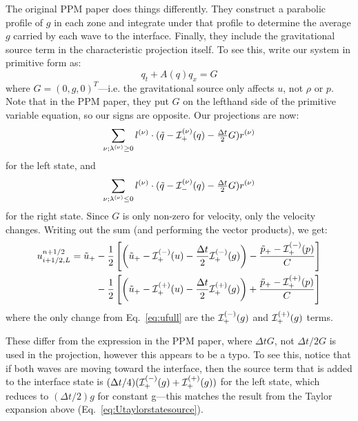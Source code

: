 The original PPM paper does things differently.  They construct a parabolic
profile of $g$ in each zone and integrate under that profile to determine
the average $g$ carried by each wave to the interface.  Finally, they include
the gravitational source term in the characteristic projection itself.
To see this, write our system in primitive form as:
\begin{equation}
q_t + A(q) q_x = G
\end{equation}
where $G = (0, g, 0)^T$---i.e. the gravitational source only affects
$u$, not $\rho$ or $p$.  Note that in the PPM paper, they put $G$ on
the lefthand side of the primitive variable equation, so our signs are
opposite.  Our projections are now:
\begin{equation}
\sum_{\nu; \lambda^{(\nu)} \ge 0}l^{(\nu)} \cdot (\tilde{q} - \mathcal{I}^{(\nu)}_+(q) - \tfrac{\Delta t}{2} G) r^{(\nu)}
\end{equation}
for the left state, and
\begin{equation}
\sum_{\nu; \lambda^{(\nu)} \le 0} l^{(\nu)} \cdot (\tilde{q} - \mathcal{I}^{(\nu)}_-(q) - \tfrac{\Delta t}{2} G) r^{(\nu)}
\end{equation}
for the right state.  Since $G$ is only non-zero for velocity, only
the velocity changes.  Writing out the sum (and performing the vector products), we
get:
\begin{align}
u_{i+1/2,L}^{n+1/2} =
   \tilde{u}_+
  &- \frac{1}{2} \left [
      \left (\tilde{u}_+ - \mathcal{I}_+^{(-)}(u) - \frac{\Delta t}{2} \mathcal{I}^{(-)}_+(g) \right ) -
       \frac{\tilde{p}_+ - \mathcal{I}_+^{(-)}(p)}{C} \right ] \nonumber \\
  &- \frac{1}{2} \left [
      \left (\tilde{u}_+ - \mathcal{I}_+^{(+)}(u) - \frac{\Delta t}{2} \mathcal{I}^{(+)}_+(g) \right ) +
       \frac{\tilde{p}_+ - \mathcal{I}_+^{(+)}(p)}{C} \right ]
\end{align}
where the only change from Eq.~\ref{eq:ufull} are the
$\mathcal{I}^{(-)}_+(g)$ and $\mathcal{I}^{(+)}_+(g)$ terms.

These differ from the expression in the PPM paper, where $\Delta t G$,
not $\Delta t/2 G$ is used in the projection, however this appears to
be a typo.  To see this, notice that if both waves are moving toward
the interface, then the source term that is added to the interface
state is $(\Delta t/4) (\mathcal{I}_+^{(-)}(g) +
\mathcal{I}_+^{(+)}(g))$ for the left state, which reduces to $(\Delta
t/2) g$ for constant g---this matches the result from the Taylor
expansion above (Eq.~\ref{eq:Utaylorstatesource}).


